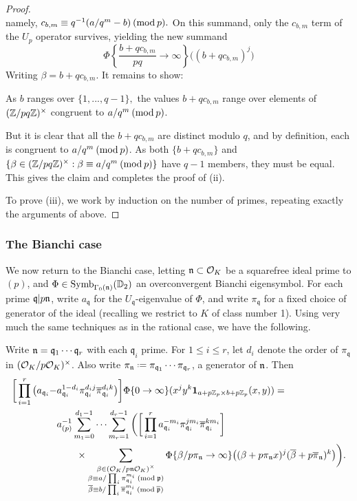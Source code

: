 \documentclass[a4paper,10pt]{article}
\newcommand{\q}{\mathfrak{q}}
\newcommand{\pibar}{\overline{\pi}}
\numberwithin{equation}{section}
\begin{document}
\begin{proof}
\[\]
namely, $c_{b,m} \equiv q^{-1}(a/q^m - b) \hspace{2pt}(\mathrm{mod}\hspace{2pt}p).$ On this summand, only the $c_{b,m}$ term of the $U_p$ operator survives, yielding the new summand
\[
 \Phi\left\{\frac{b+qc_{b,m}}{pq}\rightarrow\infty\right\}\big((b+qc_{b,m})^j\big)
\]
Writing $\beta = b+qc_{b,m}$. It remains to show:
\begin{claim}
As $b$ ranges over $\{1,...,q-1\},$ the values $b+qc_{b,m}$ range over elements of $(\mathbb{Z}/pq\mathbb{Z})^\times$ congruent to $a/q^m \hspace{2pt}(\mathrm{mod}\hspace{2pt}p)$.
\end{claim}
But it is clear that all the $b + qc_{b,m}$ are distinct modulo $q$, and by definition, each is congruent to $a/q^m \hspace{2pt}(\mathrm{mod}\hspace{2pt}p)$. As both $\{b+qc_{b,m}\}$ and $\{\beta \in (\mathbb{Z}/pq\mathbb{Z})^\times: \beta \equiv a/q^m \hspace{2pt}(\mathrm{mod}\hspace{2pt}p)\}$ have $q-1$ members, they must be equal. This gives the claim and completes the proof of (ii).

To prove (iii), we work by induction on the number of primes, repeating exactly the arguments of above.
\end{proof}


\subsubsection{The Bianchi case}
We now return to the Bianchi case, letting $\mathfrak{n}\subset \mathcal{O}_K$ be a squarefree ideal prime to $(p)$, and $\Phi \in \mathrm{Symb}_{\Gamma_0(\mathfrak{n})}(\mathbb{D}_2)$ an overconvergent Bianchi eigensymbol. For each prime $\q|p\n$, write $a_{\q}$ for the $U_{\q}$-eigenvalue of $\Phi$, and write $\pi_{\q}$ for a fixed choice of generator of the ideal (recalling we restrict to $K$ of class number 1). Using very much the same techniques as in the rational case, we have the following.

\begin{proposition}
Write $\n = \q_1\cdots\q_r$ with each $\q_i$ prime. For $1 \leq i \leq r$, let $d_{i}$ denote the order of $\pi_{\q}$ in $(\mathcal{O}_K/p\mathcal{O}_K)^\times$. Also write $\pi_{\n} \defeq \pi_{\q_1}\cdots\pi_{\q_r}$, a generator of $\mathfrak{n}$. Then 
\begin{align*}
	\bigg[\prod_{i=1}^r\big(a_{\q_i} - &a_{\q_i}^{1-d_i}\pi_{\q_i}^{d_ij}\pibar_{\q_i}^{d_ik}\big)\bigg]\Phi\{0\rightarrow\infty\}(x^jy^k \mathbf{1}_{a+p\Zp \times b+p\Zp}(x,y)) =
\\
&a_{(p)}^{-1} \sum_{m_1 = 0}^{d_1-1} \cdots \sum_{m_r = 1}^{d_r - 1} \bigg(\bigg[\prod_{i=1}^ra_{\q_i}^{-m_i}\pi_{\q_i}^{jm_i}\pibar_{\q_i}^{km_i}\bigg]\\%
&\hspace{20pt}\times\sum_{\substack{\beta \in (\roi_K/p\n\roi_K)^\times\\ \beta \equiv a/\prod_i\pi_{\q_i}^{m_i} \newmod{\pri}\\
\overline{\beta} \equiv b/\prod_i\pibar_{\q_i}^{m_i} \newmod{\pribar}}} \Phi\{\beta/p\pi_{\n}\rightarrow \infty\}\big((\beta + p\pi_{\n}x)^j(\overline{\beta} + p\pibar_{\n})^k\big)\bigg).
\end{align*}

\end{proposition}
\end{document}
